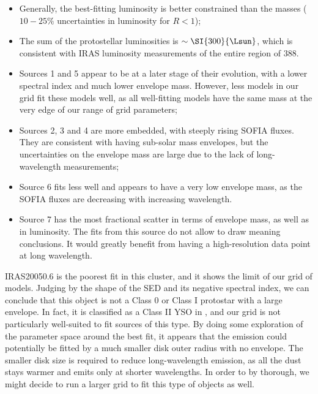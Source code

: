 \begin{itemize}
\item Generally, the best-fitting luminosity is better constrained than the masses ($10-25\%$ uncertainties in luminosity for $R<1$);
\item The sum of the protostellar luminosities is $\sim \SI{300}{\Lsun}$, which is consistent with IRAS luminosity measurements of the entire region of \SI{388}{\Lsun}.
\item Sources 1 and 5 appear to be at a later stage of their evolution, with a lower spectral index and much lower envelope mass. However, less models in our grid fit these models well, as all well-fitting models have the same mass at the very edge of our range of grid parameters;
\item Sources 2, 3 and 4 are more embedded, with steeply rising SOFIA fluxes. They are consistent with having sub-solar mass envelopes, but the uncertainties on the envelope mass are large due to the lack of long-wavelength measurements;
\item Source 6 fits less well and appears to have a very low envelope mass, as the SOFIA fluxes are decreasing with increasing wavelength.
\item Source 7 has the most fractional scatter in terms of envelope mass, as well as in luminosity. The fits from this source do not allow to draw meaning conclusions. It would greatly benefit from having a high-resolution data point at long wavelength.
\end{itemize}

IRAS20050.6 is the poorest fit in this cluster, and it shows the limit of our grid of models. Judging by the shape of the SED and its negative spectral index, we can conclude that this object is not a Class 0 or Class I protostar with a large envelope. In fact, it is classified as a Class II YSO in \citet{Gutermuth:2009gca}, and our grid is not particularly well-suited to fit sources of this type. By doing some exploration of the parameter space around the best fit, it appears that the emission could potentially be fitted by a much smaller disk outer radius with no envelope. The smaller disk size is required to reduce long-wavelength emission, as all the dust stays warmer and emits only at shorter wavelengths. In order to by thorough, we might decide to run a larger grid to fit this type of objects as well. 

